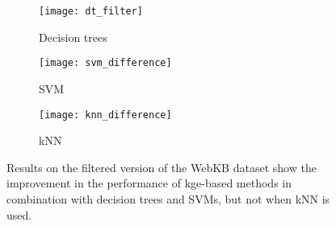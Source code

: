 \begin{figure}
	\centering
	\begin{subfigure}{0.32\linewidth}
		\centering
		\texttt{[image: dt\_filter]}
		\caption{Decision trees \label{fig:dt_difference}}
	\end{subfigure}
	\begin{subfigure}{0.32\linewidth}
		\centering
		\texttt{[image: svm\_difference]}
		\caption{SVM \label{fig:svm_difference}}
	\end{subfigure}
	\begin{subfigure}{0.32\linewidth}
		\centering
		\texttt{[image: knn\_difference]}
		\caption{kNN \label{fig:knn_difference}}
	\end{subfigure}
	\caption[Control experiment - results on the filtered version of the WebKB dataset]{Results on the filtered version of the WebKB dataset show the improvement in the performance of \gls{kge}-based methods in combination with decision trees and SVMs, but not when kNN is used.}
	\label{fig:filter_results}
\end{figure}








